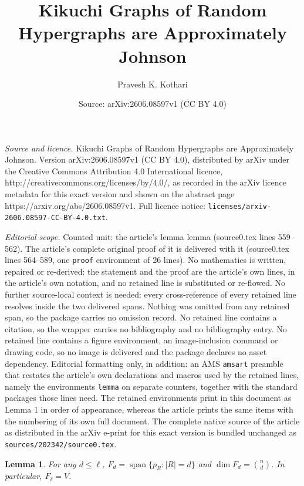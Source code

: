 \documentclass[10pt,a4paper]{amsart}
\title{Kikuchi Graphs of Random Hypergraphs are Approximately Johnson}
\author{Pravesh K. Kothari}
\date{Source: arXiv:2606.08597v1 (CC BY 4.0)}
\newtheorem{lemma}{Lemma}
\begin{document}
\maketitle

\noindent\emph{Source and licence.} Kikuchi Graphs of Random Hypergraphs are Approximately Johnson. Version arXiv:2606.08597v1 (CC BY 4.0), distributed by arXiv under the Creative Commons Attribution 4.0 International licence, http://creativecommons.org/licenses/by/4.0/, as recorded in the arXiv licence metadata for this exact version and shown on the abstract page https://arxiv.org/abs/2606.08597v1. Full licence notice: \texttt{licenses/arxiv-2606.08597-CC-BY-4.0.txt}.\par\smallskip

\noindent\textit{Editorial scope.} Counted unit: the article's lemma lemma (source0.tex lines 559--562). The article's complete original proof of it is delivered with it (source0.tex lines 564--589, one \texttt{proof} environment of 26 lines). No mathematics is written, repaired or re-derived: the statement and the proof are the article's own lines, in the article's own notation, and no retained line is substituted or re-flowed.  No further source-local context is needed: every cross-reference of every retained line resolves inside the two delivered spans.  Nothing was omitted from any retained span, so the package carries no omission record.  No retained line contains a citation, so the wrapper carries no bibliography and no bibliography entry.  No retained line contains a figure environment, an image-inclusion command or drawing code, so no image is delivered and the package declares no asset dependency.  Editorial formatting only, in addition: an AMS \texttt{amsart} preamble that restates the article's own declarations and macros used by the retained lines, namely the environments \texttt{lemma} on separate counters, together with the standard packages those lines need.  The retained environments print in this document as Lemma 1 in order of appearance, whereas the article prints the same items with the numbering of its own full document.  The complete native source of the article as distributed in the arXiv e-print for this exact version is bundled unchanged as \texttt{sources/202342/source0.tex}.
\begin{lemma}
For any $d \leq \ell$, $F_d=\operatorname{span}\{p_R: |R|=d\}$ and
$\dim F_d=\binom nd$. In particular, \(F_\ell=V\).
\end{lemma}
\end{document}
